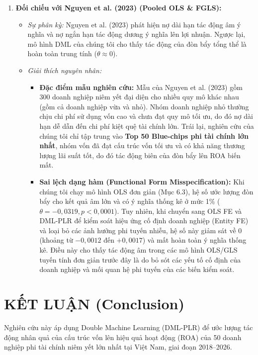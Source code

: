 \documentclass[12pt,a4paper]{article}
\begin{document}
\begin{enumerate}
    \item \textbf{Đối chiếu với Nguyen et al. (2023) (Pooled OLS \& FGLS):}
    \begin{itemize}
        \item \textit{Sự phân kỳ:} Nguyen et al. (2023) phát hiện nợ dài hạn tác động âm ý nghĩa và nợ ngắn hạn tác động dương ý nghĩa lên lợi nhuận. Ngược lại, mô hình DML của chúng tôi cho thấy tác động của đòn bẩy tổng thể là hoàn toàn trung tính ($\theta \approx 0$).
        \item \textit{Giải thích nguyên nhân:}
        \begin{itemize}
            \item \textbf{Đặc điểm mẫu nghiên cứu:} Mẫu của Nguyen et al. (2023) gồm 300 doanh nghiệp niêm yết đại diện cho nhiều quy mô khác nhau (gồm cả doanh nghiệp vừa và nhỏ). Nhóm doanh nghiệp nhỏ thường chịu chi phí sử dụng vốn cao và chưa đạt quy mô tối ưu, do đó nợ dài hạn dễ dẫn đến chi phí kiệt quệ tài chính lớn. Trái lại, nghiên cứu của chúng tôi chỉ tập trung vào \textbf{Top 50 Blue-chips phi tài chính lớn nhất}, nhóm vốn đã đạt cấu trúc vốn tối ưu và có khả năng thương lượng lãi suất tốt, do đó tác động biên của đòn bẩy lên ROA biến mất.
            \item \textbf{Sai lệch dạng hàm (Functional Form Misspecification):} Khi chúng tôi chạy mô hình OLS đơn giản (Mục 6.3), hệ số ước lượng đòn bẩy cho kết quả âm lớn và có ý nghĩa thống kê ở mức 1\% ($\theta = -0,0319, p < 0,0001$). Tuy nhiên, khi chuyển sang OLS FE và DML-PLR để kiểm soát hiệu ứng cố định doanh nghiệp (Entity FE) và loại bỏ các ảnh hưởng phi tuyến nhiễu, hệ số này giảm sát về 0 (khoảng từ $-0,0012$ đến $+0,0017$) và mất hoàn toàn ý nghĩa thống kê. Điều này cho thấy tác động âm trong các mô hình OLS/GLS tuyến tính đơn giản trước đây là do bỏ sót các yếu tố cố định của doanh nghiệp và mối quan hệ phi tuyến của các biến kiểm soát.
        \end{itemize}
    \end{itemize}
\end{enumerate}

\section{KẾT LUẬN (Conclusion)}
Nghiên cứu này áp dụng Double Machine Learning (DML-PLR) để ước lượng tác động nhân quả của cấu trúc vốn lên hiệu quả hoạt động (ROA) của 50 doanh nghiệp phi tài chính niêm yết lớn nhất tại Việt Nam, giai đoạn 2018--2026.
\end{document}
